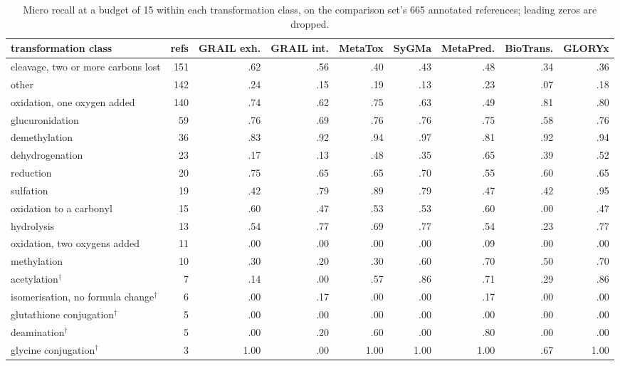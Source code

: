 \begin{table}[t]
\centering\scriptsize
\begin{threeparttable}
\caption{Micro recall at a budget of 15 within each transformation class, on the comparison set's 665 annotated references; leading zeros are dropped.}
\label{tab:si-chemistry}
\begin{tabular}{@{}lrrrrrrrr@{}}
\toprule
transformation class & refs & GRAIL exh. & GRAIL int. & MetaTox & SyGMa & MetaPred. & BioTrans. & GLORYx \\
\midrule
cleavage, two or more carbons lost & 151 & .62 & .56 & .40 & .43 & .48 & .34 & .36 \\
other & 142 & .24 & .15 & .19 & .13 & .23 & .07 & .18 \\
oxidation, one oxygen added & 140 & .74 & .62 & .75 & .63 & .49 & .81 & .80 \\
glucuronidation & 59 & .76 & .69 & .76 & .76 & .75 & .58 & .76 \\
demethylation & 36 & .83 & .92 & .94 & .97 & .81 & .92 & .94 \\
dehydrogenation & 23 & .17 & .13 & .48 & .35 & .65 & .39 & .52 \\
reduction & 20 & .75 & .65 & .65 & .70 & .55 & .60 & .65 \\
sulfation & 19 & .42 & .79 & .89 & .79 & .47 & .42 & .95 \\
oxidation to a carbonyl & 15 & .60 & .47 & .53 & .53 & .60 & .00 & .47 \\
hydrolysis & 13 & .54 & .77 & .69 & .77 & .54 & .23 & .77 \\
oxidation, two oxygens added & 11 & .00 & .00 & .00 & .00 & .09 & .00 & .00 \\
methylation & 10 & .30 & .20 & .30 & .60 & .70 & .50 & .70 \\
acetylation$^{\dagger}$ & 7 & .14 & .00 & .57 & .86 & .71 & .29 & .86 \\
isomerisation, no formula change$^{\dagger}$ & 6 & .00 & .17 & .00 & .00 & .17 & .00 & .00 \\
glutathione conjugation$^{\dagger}$ & 5 & .00 & .00 & .00 & .00 & .00 & .00 & .00 \\
deamination$^{\dagger}$ & 5 & .00 & .20 & .60 & .00 & .80 & .00 & .00 \\
glycine conjugation$^{\dagger}$ & 3 & 1.00 & .00 & 1.00 & 1.00 & 1.00 & .67 & 1.00 \\
\bottomrule
\end{tabular}
\begin{tablenotes}[flushleft]\footnotesize

\end{tablenotes}
\end{threeparttable}
\end{table}
